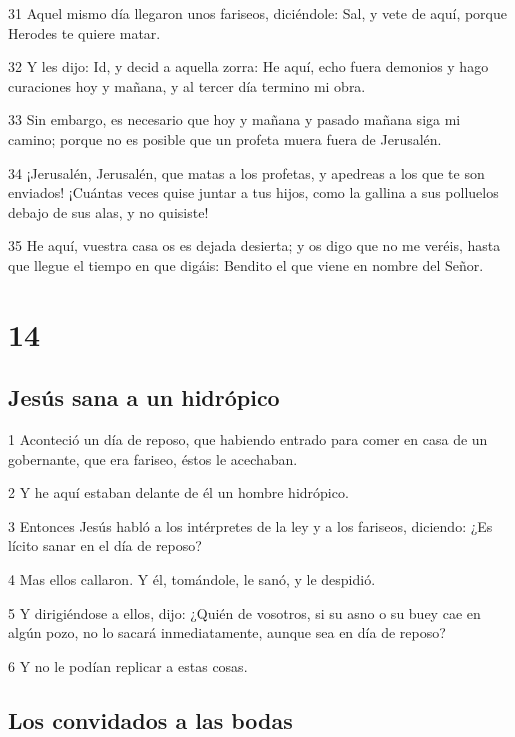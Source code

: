 \par 31 Aquel mismo día llegaron unos fariseos, diciéndole: Sal, y vete de aquí, porque Herodes te quiere matar.
\par 32 Y les dijo: Id, y decid a aquella zorra: He aquí, echo fuera demonios y hago curaciones hoy y mañana, y al tercer día termino mi obra.
\par 33 Sin embargo, es necesario que hoy y mañana y pasado mañana siga mi camino; porque no es posible que un profeta muera fuera de Jerusalén.
\par 34 ¡Jerusalén, Jerusalén, que matas a los profetas, y apedreas a los que te son enviados! ¡Cuántas veces quise juntar a tus hijos, como la gallina a sus polluelos debajo de sus alas, y no quisiste!
\par 35 He aquí, vuestra casa os es dejada desierta; y os digo que no me veréis, hasta que llegue el tiempo en que digáis: Bendito el que viene en nombre del Señor.

\chapter{14}

\section*{Jesús sana a un hidrópico}

\par 1 Aconteció un día de reposo, que habiendo entrado para comer en casa de un gobernante, que era fariseo, éstos le acechaban.
\par 2 Y he aquí estaban delante de él un hombre hidrópico.
\par 3 Entonces Jesús habló a los intérpretes de la ley y a los fariseos, diciendo: ¿Es lícito sanar en el día de reposo?
\par 4 Mas ellos callaron. Y él, tomándole, le sanó, y le despidió.
\par 5 Y dirigiéndose a ellos, dijo: ¿Quién de vosotros, si su asno o su buey cae en algún pozo, no lo sacará inmediatamente, aunque sea en día de reposo?
\par 6 Y no le podían replicar a estas cosas.

\section*{Los convidados a las bodas}

